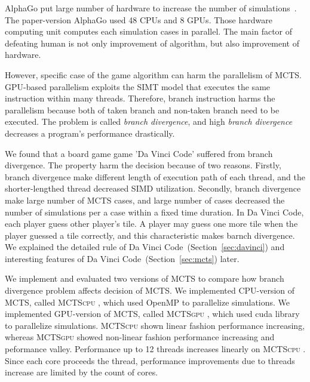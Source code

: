 \documentclass[conference]{IEEEtran}
\newcommand{\cpu} {\textsc{MCTScpu} }
\newcommand{\gpu} {\textsc{MCTSgpu} }
\begin{document}
AlphaGo put large number of hardware to increase the number of simulations~\cite{silver2016mastering_alphago}.
The paper-version AlphaGo used 48 CPUs and 8 GPUs.
Those hardware computing unit computes each simulation cases in parallel.
The main factor of defeating human is not only improvement of algorithm, but also improvement of hardware.

However, specific case of the game algorithm can harm the parallelism of MCTS.
GPU-based parallelism exploits the SIMT model that executes the same instruction within many threads.
Therefore, branch instruction harms the parallelism because both of taken branch and non-taken branch need to be executed.
The problem is called \textit{branch divergence}, and high \textit{branch divergence} decreases a program's performance drastically.

We found that a board game game 'Da Vinci Code' suffered from branch divergence.
The property harm the decision because of two reasons.
Firstly, branch divergence make different length of execution path of each thread, and the shorter-lengthed thread decreased SIMD utilization.
Secondly, branch divergence make large number of MCTS cases, and large number of cases decreased the number of simulations per a case within a fixed time duration.
In Da Vinci Code, each player guess other player's tile.
A player may guess one more tile when the player guessed a tile correctly, and this characteristic makes barnch divergence.
We explained the detailed rule of Da Vinci Code~(Section~\ref{sec:davinci}) and interesting features of Da Vinci Code~(Section~\ref{sec:mcts}) later.


We implement and evaluated two versions of MCTS to compare how branch divergence problem affects decision of MCTS.
We implemented CPU-version of MCTS, called \cpu, which used OpenMP to parallelize simulations.
We implemented GPU-version of MCTS, called \gpu, which used cuda library to parallelize simulations.
\cpu shown linear fashion performance increasing, whereas \gpu showed non-linear fashion performance increasing and peformance valley.
Performance up to 12 threads increases linearly on \cpu.
Since each core proceeds the thread, performance improvements due to threads increase are limited by the count of cores.
\end{document}
